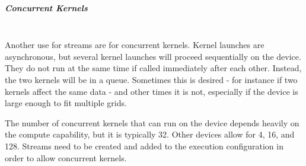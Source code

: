 \subparagraph{Concurrent Kernels} \hspace{0pt} \\
\indent Another use for streams are for concurrent kernels. Kernel launches are asynchronous, but several kernel launches will proceed sequentially on the device. They do not run at the same time if called immediately after each other. Instead, the two kernels will be in a queue. Sometimes this is desired - for instance if two kernels affect the same data - and other times it is not, especially if the device is large enough to fit multiple grids. 

The number of concurrent kernels that can run on the device depends heavily on the compute capability, but it is typically 32. Other devices allow for 4, 16, and 128. Streams need to be created and added to the \gls{execution configuration} in order to allow concurrent kernels. 


